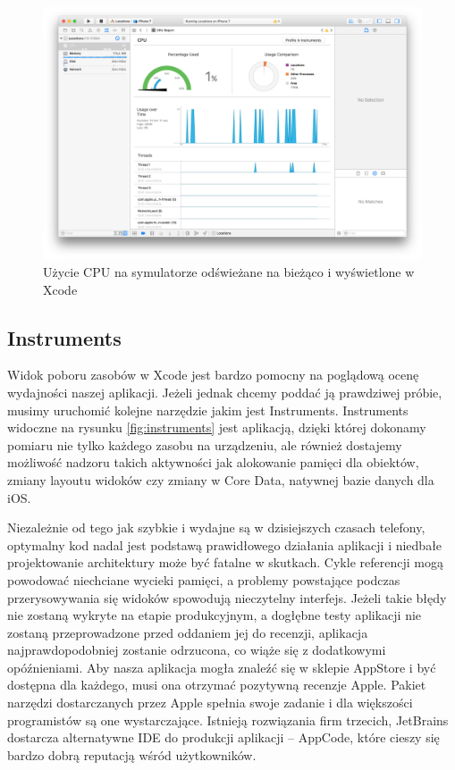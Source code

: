 \begin{figure}[ht!]
  \centering
  \includegraphics[width=120mm]{images/chapter-2-image-5-debugger.png}
  \caption{Użycie CPU na symulatorze odświeżane na bieżąco i wyświetlone w Xcode}
  \label{fig:simulatorcpu}
\end{figure}

\subsection{Instruments}

Widok poboru zasobów w Xcode jest bardzo pomocny na poglądową ocenę wydajności naszej aplikacji. Jeżeli jednak chcemy poddać ją prawdziwej próbie, musimy uruchomić kolejne narzędzie jakim jest Instruments. Instruments widoczne na rysunku \ref{fig:instruments} jest aplikacją, dzięki której dokonamy pomiaru nie tylko każdego zasobu na urządzeniu, ale również dostajemy możliwość nadzoru takich aktywności jak alokowanie pamięci dla obiektów, zmiany layoutu widoków czy zmiany w Core Data, natywnej bazie danych dla iOS.

Niezależnie od tego jak szybkie i wydajne są w dzisiejszych czasach telefony, optymalny kod nadal jest podstawą prawidłowego działania aplikacji i niedbałe projektowanie architektury może być fatalne w skutkach. Cykle referencji mogą powodować niechciane wycieki pamięci, a problemy powstające podczas przerysowywania się widoków spowodują nieczytelny interfejs. Jeżeli takie błędy nie zostaną wykryte na etapie produkcyjnym, a dogłębne testy aplikacji nie zostaną przeprowadzone przed oddaniem jej do recenzji, aplikacja najprawdopodobniej zostanie odrzucona, co wiąże się z dodatkowymi opóźnieniami. Aby nasza aplikacja mogła znaleźć się w sklepie AppStore i być dostępna dla każdego, musi ona otrzymać pozytywną recenzje Apple. Pakiet narzędzi dostarczanych przez Apple spełnia swoje zadanie i dla większości programistów są one wystarczające. Istnieją rozwiązania firm trzecich, JetBrains dostarcza alternatywne IDE do produkcji aplikacji -- AppCode, które cieszy się bardzo dobrą reputacją wśród użytkowników.

